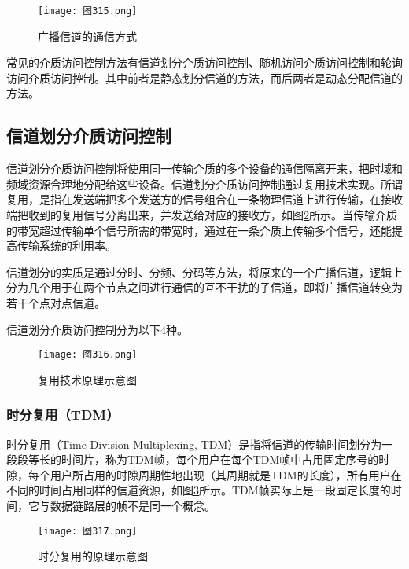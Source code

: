 \documentclass{ctexbook}
\begin{document}
	\begin{figure}[h]
		\centering
		\caption{广播信道的通信方式}
		\label{fig:broadcast_communication}
		\texttt{[image: 图315.png]} %
	\end{figure}
	
	常见的介质访问控制方法有信道划分介质访问控制、随机访问介质访问控制和轮询访问介质访问控制。其中前者是静态划分信道的方法，而后两者是动态分配信道的方法。
	
	
	
	\subsection{信道划分介质访问控制}
	
	信道划分介质访问控制将使用同一传输介质的多个设备的通信隔离开来，把时域和频域资源合理地分配给这些设备。信道划分介质访问控制通过复用技术实现。所谓复用，是指在发送端把多个发送方的信号组合在一条物理信道上进行传输，在接收端把收到的复用信号分离出来，并发送给对应的接收方，如图\ref{fig:multiplexing}所示。当传输介质的带宽超过传输单个信号所需的带宽时，通过在一条介质上传输多个信号，还能提高传输系统的利用率。
	
	信道划分的实质是通过分时、分频、分码等方法，将原来的一个广播信道，逻辑上分为几个用于在两个节点之间进行通信的互不干扰的子信道，即将广播信道转变为若干个点对点信道。
	
	信道划分介质访问控制分为以下4种。
	
	\begin{figure}[h]
		\centering
		\caption{复用技术原理示意图}
		\label{fig:multiplexing}
		\texttt{[image: 图316.png]} %
	\end{figure}
	
	\subsubsection{时分复用（TDM）}
	时分复用（Time Division Multiplexing, TDM）是指将信道的传输时间划分为一段段等长的时间片，称为TDM帧，每个用户在每个TDM帧中占用固定序号的时隙，每个用户所占用的时隙周期性地出现（其周期就是TDM的长度），所有用户在不同的时间占用同样的信道资源，如图\ref{fig:tdm_principle}所示。TDM帧实际上是一段固定长度的时间，它与数据链路层的帧不是同一个概念。
	
	\begin{figure}[h]
		\centering
		\caption{时分复用的原理示意图}
		\label{fig:tdm_principle}
		\texttt{[image: 图317.png]} %
	\end{figure}
	
\end{document}
